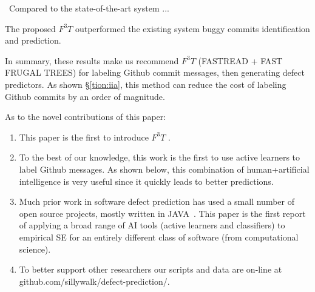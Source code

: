 \documentclass[10pt,journal,compsoc]{IEEEtran}
\newcommand{\bi}{\begin{itemize}[leftmargin=0.4cm]}
\newcommand{\be}{\begin{enumerate}[leftmargin=0.4cm]}
\newcommand{\ee}{\end{enumerate}}
\newcommand{\fig}[1]{Figure~\ref{fig:#1}}
\newcommand{\tion}[1]{\S\ref{tion:#1}}
\newenvironment{RQ}[1]%
{\noindent\begin{minipage}[c]{\linewidth}%
\begin{bclogo}[couleur=gray!25,%
                arrondi=0.1,%
                logo=\bctrombone,%
                ombre=true]{{\normalsize ~#1}}}%
{\end{bclogo}\end{minipage}\vspace{2mm}}
\begin{document}
\begin{RQ}{Compared to the state-of-the-art system ...}

The proposed $F^3T$ outperformed the existing system buggy commits identification and prediction.

\end{RQ}

In summary,
these results make us recommend $F^3T$ (FASTREAD + FAST FRUGAL TREES) for labeling Github
commit messages, then generating defect predictors. 
As shown \tion{iia},  this method can reduce the cost
of labeling Github commits by an order of magnitude.


\noindent
As to the novel contributions of this paper:
\be
\item This paper is the first to introduce $F^3T$ .
\item
To the best of our knowledge,
 this work  is the first to use active learners  to label  Github messages.
 As shown below, this combination of human+artificial intelligence is very useful since it
 quickly leads to better predictions.
\item
Much prior work in software defect prediction has used a small number of open source projects,
mostly written in JAVA~\cite{Fu2016TuningFS}.
This paper is the first report of applying a broad range of AI tools (active learners and classifiers)
to  empirical SE for an entirely different class of software (from computational science). 
\item 
To better support other researchers  
  our scripts and  data are  on-line
at github.com/sillywalk/defect-prediction/.
\ee
\end{document}
